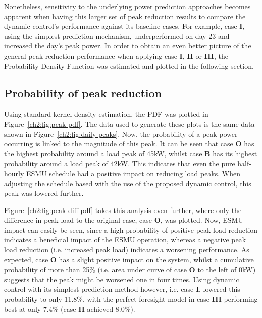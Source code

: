 Nonetheless, sensitivity to the underlying power prediction approaches becomes apparent when having this larger set of peak reduction results to compare the dynamic control's performance against its baseline cases.
For example, case \textbf{I}, using the simplest prediction mechanism, underperformed on day 23 and increased the day's peak power.
In order to obtain an even better picture of the general peak reduction performance when applying case \textbf{I}, \textbf{II} or \textbf{III}, the Probability Density Function was estimated and plotted in the following section.

\subsection{Probability of peak reduction}
\label{ch2:subsec:probability-of-peak-reduction}



Using standard kernel density estimation, the PDF was plotted in Figure~\ref{ch2:fig:peak-pdf}.
The data used to generate these plots is the same data shown in Figure~\ref{ch2:fig:daily-peaks}.
Now, the probability of a peak power occurring is linked to the magnitude of this peak.
It can be seen that case \textbf{O} has the highest probability around a load peak of 45kW, whilst case \textbf{B} has its highest probability around a load peak of 42kW.
This indicates that even the pure half-hourly ESMU schedule had a positive impact on reducing load peaks.
When adjusting the schedule based with the use of the proposed dynamic control, this peak was lowered further.



Figure~\ref{ch2:fig:peak-diff-pdf} takes this analysis even further, where only the difference in peak load to the original case, case \textbf{O}, was plotted.
Now, ESMU impact can easily be seen, since a high probability of positive peak load reduction indicates a beneficial impact of the ESMU operation, whereas a negative peak load reduction (i.e. increased peak load) indicates a worsening performance.
As expected, case \textbf{O} has a slight positive impact on the system, whilst a cumulative probability of more than 25\% (i.e. area under curve of case \textbf{O} to the left of 0kW) suggests that the peak might be worsened one in four times.
Using dynamic control with its simplest prediction method however, i.e. case \textbf{I}, lowered this probability to only 11.8\%, with the perfect foresight model in case \textbf{III} performing best at only 7.4\% (case \textbf{II} achieved 8.0\%).

